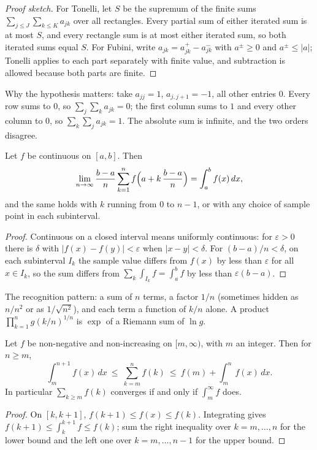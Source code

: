 \begin{proof}[Proof sketch]
For Tonelli, let $S$ be the supremum of the finite sums $\sum_{j\le J}\sum_{k\le K}a_{jk}$ over all rectangles. Every partial sum of either iterated sum is at most $S$, and every rectangle sum is at most either iterated sum, so both iterated sums equal $S$. For Fubini, write $a_{jk}=a^+_{jk}-a^-_{jk}$ with $a^\pm\ge 0$ and $a^\pm\le|a|$; Tonelli applies to each part separately with finite value, and subtraction is allowed because both parts are finite.
\end{proof}

Why the hypothesis matters: take $a_{jj}=1$, $a_{j,j+1}=-1$, all other entries $0$. Every row sums to $0$, so $\sum_j\sum_k a_{jk}=0$; the first column sums to $1$ and every other column to $0$, so $\sum_k\sum_j a_{jk}=1$. The absolute sum is infinite, and the two orders disagree.

\begin{theorem}
Let $f$ be continuous on $[a,b]$. Then
\[
\lim_{n\to\infty}\frac{b-a}{n}\sum_{k=1}^{n}f\Bigl(a+k\,\frac{b-a}{n}\Bigr)=\int_a^b f(x)\,dx,
\]
and the same holds with $k$ running from $0$ to $n-1$, or with any choice of sample point in each subinterval.
\end{theorem}

\begin{proof}
Continuous on a closed interval means uniformly continuous: for $\varepsilon>0$ there is $\delta$ with $|f(x)-f(y)|<\varepsilon$ when $|x-y|<\delta$. For $(b-a)/n<\delta$, on each subinterval $I_k$ the sample value differs from $f(x)$ by less than $\varepsilon$ for all $x\in I_k$, so the sum differs from $\sum_k\int_{I_k}f=\int_a^b f$ by less than $\varepsilon(b-a)$.
\end{proof}

The recognition pattern: a sum of $n$ terms, a factor $1/n$ (sometimes hidden as $n/n^2$ or as $1/\sqrt{n^2}$), and each term a function of $k/n$ alone. A product $\prod_{k=1}^n g(k/n)^{1/n}$ is $\exp$ of a Riemann sum of $\ln g$.

\begin{lemma}
Let $f$ be non-negative and non-increasing on $[m,\infty)$, with $m$ an integer. Then for $n\ge m$,
\[
\int_m^{n+1}f(x)\,dx\ \le\ \sum_{k=m}^{n}f(k)\ \le\ f(m)+\int_m^{n}f(x)\,dx.
\]
In particular $\sum_{k\ge m}f(k)$ converges if and only if $\int_m^\infty f$ does.
\end{lemma}

\begin{proof}
On $[k,k+1]$, $f(k+1)\le f(x)\le f(k)$. Integrating gives $f(k+1)\le\int_k^{k+1}f\le f(k)$; sum the right inequality over $k=m,\dots,n$ for the lower bound and the left one over $k=m,\dots,n-1$ for the upper bound.
\end{proof}

